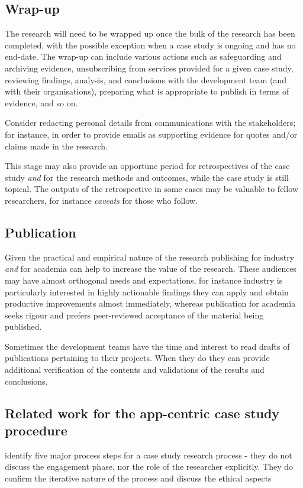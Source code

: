 \subsection{Wrap-up}
The research will need to be wrapped up once the bulk of the research has been completed, with the possible exception when a case study is ongoing and has no end-date. The wrap-up can include various actions such as safeguarding and archiving evidence, unsubscribing from services provided for a given case study, reviewing findings, analysis, and conclusions with the development team (and with their organisations), preparing what is appropriate to publish in terms of evidence, and so on.

Consider redacting personal details from communications with the stakeholders; for instance, in order to provide emails as supporting evidence for quotes and/or claims made in the research. 

This stage may also provide an opportune period for retrospectives of the case study \textit{and} for the research methods and outcomes, while the case study is still topical. The outputs of the retrospective in some cases may be valuable to fellow researchers, for instance \emph{caveats} for those who follow. 

\subsection{Publication}
Given the practical and empirical nature of the research publishing for industry \emph{and} for academia can help to increase the value of the research. These audiences may have almost orthogonal needs and expectations, for instance industry is particularly interested in highly actionable findings they can apply and obtain productive improvements almost immediately, whereas publication for academia seeks rigour and prefers peer-reviewed acceptance of the material being published.

Sometimes the development teams have the time and interest to read drafts of publications pertaining to their projects. When they do they can provide additional verification of the contents and validations of the results and conclusions.

\subsection{Related work for the app-centric case study procedure}
\citep[pp. 137-138]{runeson_2008_guidelines_for_conducting_and_reporting_case_study_research_in_sw_eng} identify five major process steps for a case study research process - they do not discuss the engagement phase, nor the role of the researcher explicitly. They do confirm the iterative nature of the process and discuss the ethical aspects %

